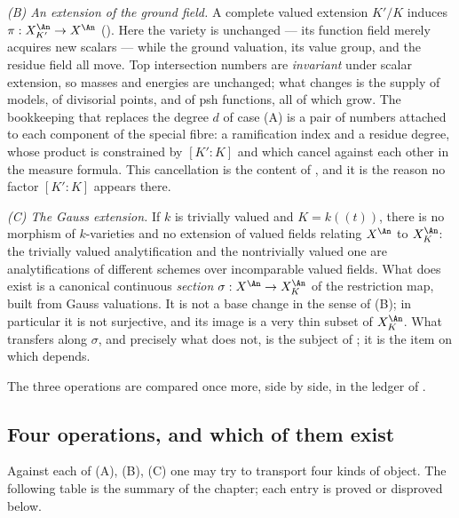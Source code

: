 \emph{(B) An extension of the ground field.}  A complete valued extension
\(K'/K\) induces \(\pi:X_{K'}^{\An}\to X^{\An}\)
().  Here the variety is unchanged --- its
function field merely acquires new scalars --- while the ground valuation,
its value group, and the residue field all move.  Top intersection numbers
are \emph{invariant} under scalar extension, so masses and energies are
unchanged; what changes is the supply of models, of divisorial points, and of
psh functions, all of which grow.  The bookkeeping that replaces the degree
\(d\) of case (A) is a pair of numbers attached to each component of the
special fibre: a ramification index and a residue degree, whose product is
constrained by \([K':K]\) and which cancel against each other in the measure
formula.  This cancellation is the content of
, and it is the reason no factor \([K':K]\) appears
there.

\emph{(C) The Gauss extension.}  If \(k\) is trivially valued and
\(K=k(\!(t)\!)\), there is no morphism of \(k\)-varieties and no
extension of valued fields relating \(X^{\An}\) to \(X_K^{\An}\): the
trivially valued analytification and the nontrivially valued one are
analytifications of different schemes over incomparable valued fields.  What
does exist is a canonical continuous \emph{section}
\(\sigma:X^{\An}\to X_K^{\An}\) of the restriction map, built from Gauss
valuations.  It is not a base change in the sense of (B); in particular it is
not surjective, and its image is a very thin subset of \(X_K^{\An}\).  What
transfers along \(\sigma\), and precisely what does not, is the subject of
; it is the item on which  depends.

The three operations are compared once more, side by side, in the ledger of
.

\subsection{Four operations, and which of them exist}
\label{sec:ch30-four-operations}

Against each of (A), (B), (C) one may try to transport four kinds of object.
The following table is the summary of the chapter; each entry is proved or
disproved below.

